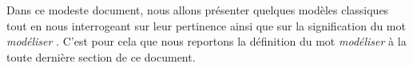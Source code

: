 Dans ce modeste document, nous allons présenter quelques modèles classiques tout en nous interrogeant sur leur pertinence ainsi que sur la signification du mot \emph{\og modéliser \fg{}}. C'est pour cela que nous reportons la définition du mot \emph{\og modéliser \fg{}} à la toute dernière section de ce document.